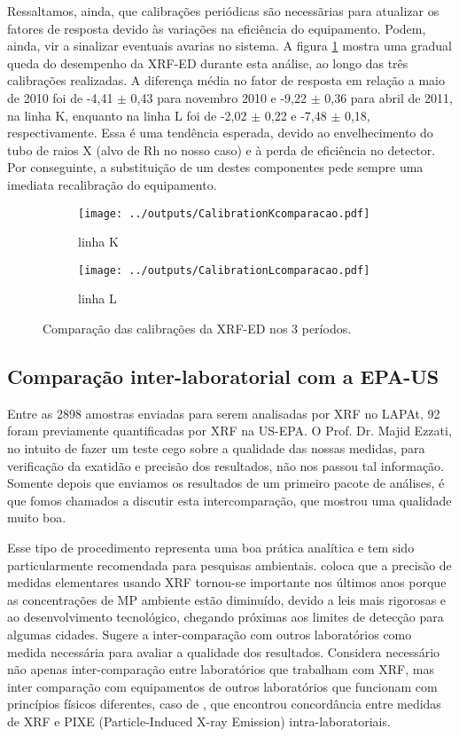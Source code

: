 Ressaltamos, ainda, que calibrações periódicas são necessãrias para atualizar os
fatores de resposta devido às variações na eficiência do equipamento. Podem, 
ainda, vir a sinalizar eventuais avarias no sistema.
A figura \ref{fig:compara_calibracao} mostra uma gradual queda do desempenho 
da XRF-ED durante esta análise, ao longo das três calibrações realizadas. 
A diferença média no fator de resposta em relação a maio de 2010 foi de 
-4,41 $\pm$ 0,43 para novembro 2010 e -9,22 $\pm$ 0,36 para abril de 2011, 
na linha K, enquanto na linha L foi de -2,02 $\pm$ 0,22 e -7,48 $\pm$ 0,18, 
respectivamente. Essa é uma tendência esperada, devido ao envelhecimento do tubo
de raios X (alvo de Rh no nosso caso) e à perda de eficiência no detector. 
Por conseguinte, a substituição de um destes componentes pede sempre uma 
imediata recalibração do equipamento.

\begin{figure}[H]
  \begin{subfigure}[b]{0.5\textwidth}
    \texttt{[image: ../outputs/CalibrationKcomparacao.pdf]}
    \caption{linha K}
  \end{subfigure}%
  \begin{subfigure}[b]{0.5\textwidth}
    \texttt{[image: ../outputs/CalibrationLcomparacao.pdf]}
    \caption{linha L}
  \end{subfigure}
  \caption{Comparação das calibrações da XRF-ED nos 3 períodos. 
          \label{fig:compara_calibracao}}
\end{figure}

\subsection{Comparação inter-laboratorial com a EPA-US}

Entre as 2898 amostras enviadas para serem analisadas por XRF no LAPAt, 
92 foram previamente quantificadas por XRF na US-EPA.  O Prof. Dr. Majid Ezzati, 
no intuito de fazer um teste cego sobre a qualidade das nossas medidas, 
para verificação da exatidão e precisão dos resultados, não nos passou tal 
informação. Somente depois que enviamos os resultados de um primeiro pacote de 
análises, é que fomos chamados a discutir esta intercomparação, que mostrou uma 
qualidade muito boa. 

Esse tipo de procedimento representa uma boa prática analítica e tem sido 
particularmente recomendada para pesquisas ambientais. \citet{kang2014} coloca 
que a precisão de medidas elementares usando XRF tornou-se importante nos 
últimos anos porque as concentrações de MP ambiente estão diminuído, devido a 
leis mais rigorosas e ao desenvolvimento tecnológico, chegando próximas aos 
limites de detecção para algumas cidades. Sugere a inter-comparação com outros 
laboratórios como medida necessária para avaliar a qualidade dos resultados. 
Considera necessário não apenas inter-comparação entre laboratórios que 
trabalham com XRF, mas inter comparação com equipamentos de outros laboratórios 
que funcionam com princípios físicos diferentes, caso de \citet{nejedly1998}, 
que encontrou concordância entre medidas de XRF e PIXE 
(Particle-Induced X-ray Emission) intra-laboratoriais.

